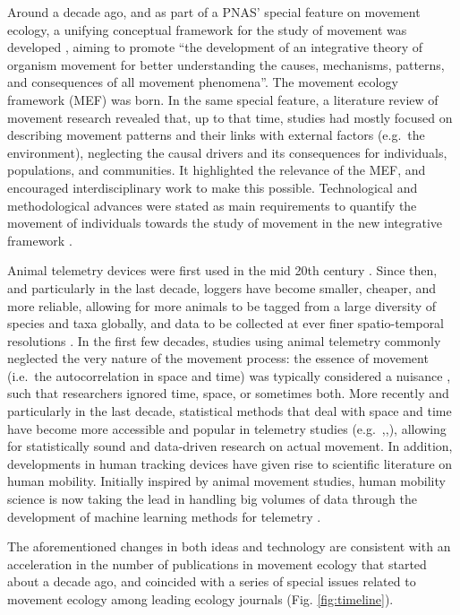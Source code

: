 \documentclass[a4paper,12pt]{article}
\begin{document}
Around a decade ago, and as part of a PNAS' special feature on movement
ecology, a unifying conceptual framework for the study of movement was
developed \cite{Nathan2008}, aiming to promote ``the development of an integrative
theory of organism movement for better understanding the causes,
mechanisms, patterns, and consequences of all movement phenomena''. The
movement ecology framework (MEF) was born. In the same special feature,
a literature review of movement research \cite{Holyoak2008} revealed that, up to that
time, studies had mostly focused on describing movement patterns and
their links with external factors (e.g.~the environment), neglecting the
causal drivers and its consequences for individuals, populations, and
communities. It highlighted the relevance of the MEF, and encouraged
interdisciplinary work to make this possible. Technological and
methodological advances were stated as main requirements to quantify the
movement of individuals towards the study of movement in the new
integrative framework \cite{Nathan2008}.

Animal telemetry devices were first used in the mid 20th century \cite{Thums2018}.
Since then, and particularly in the last decade, loggers have become
smaller, cheaper, and more reliable, allowing for more animals to be
tagged from a large diversity of species and taxa globally, and data to
be collected at ever finer spatio-temporal resolutions \cite{Kays2015}. In the first
few decades, studies using animal telemetry commonly neglected the very
nature of the movement process: the essence of movement (i.e.~the
autocorrelation in space and time) was typically considered a nuisance
\cite{Swihart1985}, such that researchers ignored time, space, or sometimes both. More
recently and particularly in the last decade, statistical methods that
deal with space and time have become more accessible and popular in
telemetry studies (e.g.~\cite{Avgar2016},\cite{Gurarie2016},\cite{Gloaguen2015a}), allowing for statistically
sound and data-driven research on actual movement. In addition,
developments in human tracking devices have given rise to scientific
literature on human mobility. Initially inspired by animal movement
studies, human mobility science is now taking the lead in handling big
volumes of data through the development of machine learning methods for
telemetry \cite{Thums2018}.

The aforementioned changes in both ideas and technology are consistent
with an acceleration in the number of publications in movement ecology
that started about a decade ago, and coincided with a series of special
issues related to movement ecology among leading ecology journals (Fig.
\ref{fig:timeline}).
\end{document}
